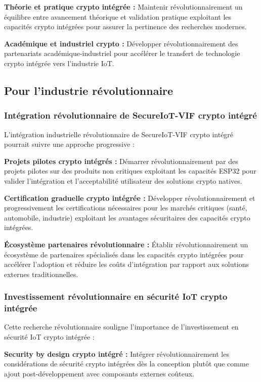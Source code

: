 \textbf{Théorie et pratique crypto intégrée :} Maintenir révolutionnairement un équilibre entre avancement théorique et validation pratique exploitant les capacités crypto intégrées pour assurer la pertinence des recherches modernes.

\textbf{Académique et industriel crypto :} Développer révolutionnairement des partenariats académique-industriel pour accélérer le transfert de technologie crypto intégrée vers l'industrie IoT.

\subsection{Pour l'industrie révolutionnaire}

\subsubsection{Intégration révolutionnaire de SecureIoT-VIF crypto intégré}

L'intégration industrielle révolutionnaire de SecureIoT-VIF crypto intégré pourrait suivre une approche progressive :

\textbf{Projets pilotes crypto intégrés :} Démarrer révolutionnairement par des projets pilotes sur des produits non critiques exploitant les capacités ESP32 pour valider l'intégration et l'acceptabilité utilisateur des solutions crypto natives.

\textbf{Certification graduelle crypto intégrée :} Développer révolutionnairement et progressivement les certifications nécessaires pour les marchés critiques (santé, automobile, industrie) exploitant les avantages sécuritaires des capacités crypto intégrées.

\textbf{Écosystème partenaires révolutionnaire :} Établir révolutionnairement un écosystème de partenaires spécialisés dans les capacités crypto intégrées pour accélérer l'adoption et réduire les coûts d'intégration par rapport aux solutions externes traditionnelles.

\subsubsection{Investissement révolutionnaire en sécurité IoT crypto intégrée}

Cette recherche révolutionnaire souligne l'importance de l'investissement en sécurité IoT crypto intégrée :

\textbf{Security by design crypto intégré :} Intégrer révolutionnairement les considérations de sécurité crypto intégrées dès la conception plutôt que comme ajout post-développement avec composants externes coûteux.


